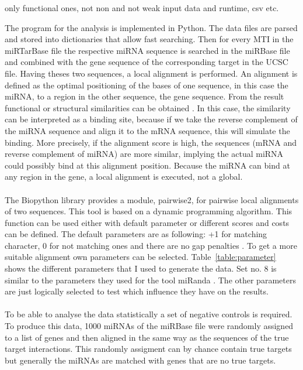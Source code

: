 \documentclass[12pt]{article}
\begin{document}
only functional ones, not non and not weak
input data and runtime, csv etc.

The program for the analysis is implemented in Python. The data files are parsed and stored into dictionaries that allow fast searching. Then for every MTI in the miRTarBase file the respective miRNA sequence is searched in the miRBase file and combined with the gene sequence of the corresponding target in the UCSC file. Having theses two sequences, a local alignment is performed. An alignment is defined as the optimal positioning of the bases of one sequence, in this case the miRNA, to a region in the other sequence, the gene sequence. From the result functional or structural similarities can be obtained \cite{alignment}. In this case, the similarity can be interpreted as a binding site, because if we take the reverse complement of the miRNA sequence and align it to the mRNA sequence, this will simulate the binding. More precisely, if the alignment score is high, the sequences (mRNA and reverse complement of miRNA) are more similar, implying  the actual miRNA could possibly bind at this alignment position. Because the miRNA can bind at any region in the gene, a local alignment is executed, not a global.\\\\

The Biopython library provides a module, pairwise2, for pairwise local alignments of two sequences. This tool is based on a dynamic programming algorithm. This function can be used either with default parameter or different scores and costs can be defined. The default parameters are as following: +1 for matching character, 0 for not matching ones and there are no gap penalties \cite{pairwise}. To get a more suitable alignment own parameters can be selected. Table~\ref{table:parameter} shows the different parameters that I used to generate the data. Set no. 8 is similar to the parameters they used for the tool miRanda \cite{Enright}. The other parameters are just logically selected to test which influence they have on the results. \\\\

To be able to analyse the data statistically a set of negative controls is required. To produce this data, 1000 miRNAs of the miRBase file were randomly assigned to a list of genes and then aligned in the same way as the sequences of the true target interactions. This randomly assigment can by chance contain true targets but generally the miRNAs are matched with genes that are no true targets. \\\\
\end{document}
